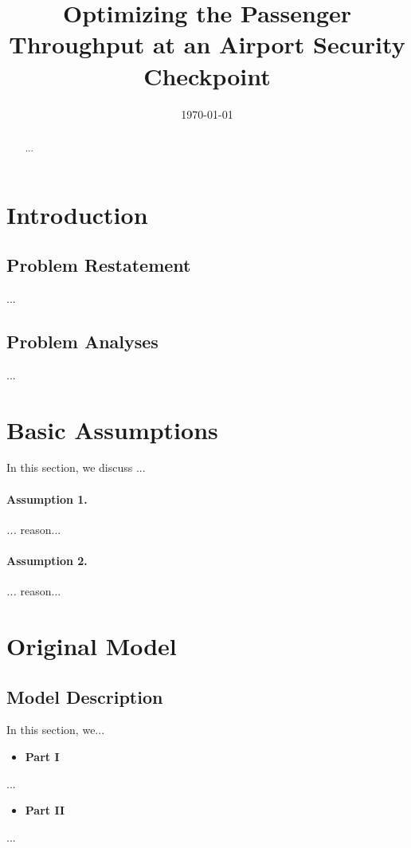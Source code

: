 \documentclass{mcmthesis}
\begin{document}
\title{Optimizing the Passenger Throughput at an Airport Security Checkpoint}

\date{\today}
	\begin{abstract}
		...
	\end{abstract}

\maketitle
\newpage
\tableofcontents

\newpage
\section{Introduction}

\subsection{Problem Restatement}
	...
\subsection{Problem Analyses}
	...
\section{Basic Assumptions}
	In this section, we discuss ... 
	\paragraph{Assumption 1.}\label{as1}
		\emph{...}
		reason...
	
	\paragraph{Assumption 2.}
		\emph{...}
		reason...
	
\section{Original Model}
\subsection{Model Description}
	In this section, we...
	\begin{itemize}
		\item \textbf{Part I}
	\end{itemize}
	...
	\begin{itemize}
		\item \textbf{Part II}
	\end{itemize}
	...
\end{document}
